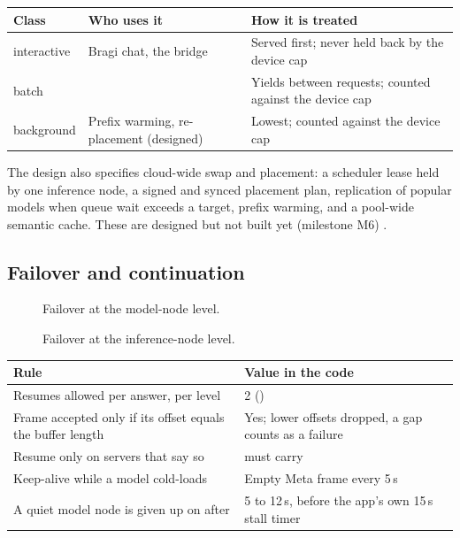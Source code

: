 \begin{table}[htbp]
\centering\small
\begin{tabularx}{\linewidth}{@{}llY@{}}
\toprule
Class & Who uses it & How it is treated \\
\midrule
interactive & Bragi chat, the bridge & Served first; never held back by the device cap \\
batch &  & Yields between requests; counted against the device cap \\
background & Prefix warming, re-placement (designed) & Lowest; counted against the device cap \\
\bottomrule
\end{tabularx}
\end{table}

The design also specifies cloud-wide swap and placement: a scheduler lease held by one inference
node, a signed and synced placement plan, replication of popular models when queue wait exceeds
a target, prefix warming, and a pool-wide semantic cache. These are designed but not built yet (milestone M6) \planned.

\subsection{Failover and continuation}\label{sec:failover}

\begin{figure}[htbp]
\centering
{}
\caption{Failover at the model-node level.}
\end{figure}

\begin{figure}[htbp]
\centering
{}
\caption{Failover at the inference-node level.}
\end{figure}

\begin{table}[htbp]
\centering\small
\begin{tabularx}{\linewidth}{@{}YL{6.2cm}@{}}
\toprule
Rule & Value in the code \\
\midrule
Resumes allowed per answer, per level & 2 () \\
Frame accepted only if its offset equals the buffer length & Yes; lower offsets dropped, a gap counts as a failure \\
Resume only on servers that say so &  must carry  \\
Keep-alive while a model cold-loads & Empty Meta frame every 5\,s \\
A quiet model node is given up on after & 5 to 12\,s, before the app's own 15\,s stall timer \\
\bottomrule
\end{tabularx}
\end{table}

